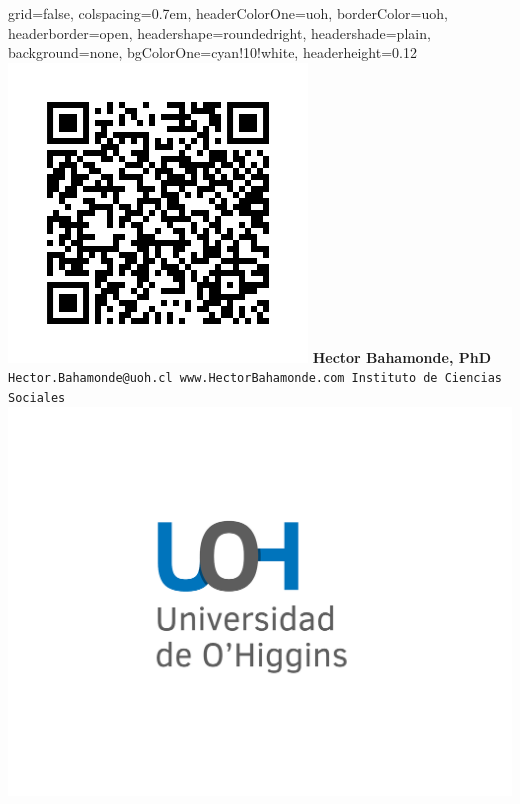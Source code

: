 \documentclass[landscape,a0paper,fontscale=0.292]{baposter}
\begin{document}
\begin{poster}{
 grid=false,
 colspacing=0.7em,
 headerColorOne=uoh,
 borderColor=uoh,
 headerborder=open,
 headershape=roundedright,
 headershade=plain,
 background=none,
 bgColorOne=cyan!10!white,
 headerheight=0.12\textheight}
 {
      \includegraphics[width=0.08\linewidth]{qr}
 }
 {\LARGE {\unskip}}
 {{\bf{\color{uoh}Hector Bahamonde, PhD}}\\[1em]
 {\texttt{Hector.Bahamonde@uoh.cl \hspace{1cm} www.HectorBahamonde.com \hspace{1cm} Instituto de Ciencias Sociales}}}
 {
    \includegraphics[height=0.25\textheight]{logo}
 }



\end{poster}
\end{document}

